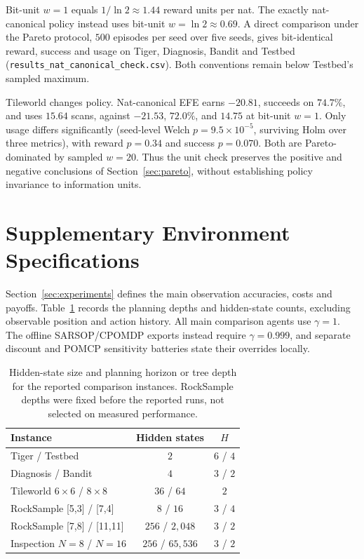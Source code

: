 Bit-unit $w=1$ equals $1/\ln2\approx1.44$ reward units per nat. The exactly nat-canonical policy instead uses bit-unit $w=\ln2\approx0.69$. A direct comparison under the Pareto protocol, $500$ episodes per seed over five seeds, gives bit-identical reward, success and usage on Tiger, Diagnosis, Bandit and Testbed (\texttt{results\_nat\_canonical\_check.csv}). Both conventions remain below Testbed's sampled maximum.

Tileworld changes policy. Nat-canonical EFE earns $-20.81$, succeeds on $74.7\%$, and uses $15.64$ scans, against $-21.53$, $72.0\%$, and $14.75$ at bit-unit $w=1$. Only usage differs significantly (seed-level Welch $p=9.5\times10^{-5}$, surviving Holm over three metrics), with reward $p=0.34$ and success $p=0.070$. Both are Pareto-dominated by sampled $w=20$. Thus the unit check preserves the positive and negative conclusions of Section~\ref{sec:pareto}, without establishing policy invariance to information units.

\FloatBarrier

\section{Supplementary Environment Specifications}
\label{app:envs}

Section~\ref{sec:experiments} defines the main observation accuracies, costs and payoffs. Table~\ref{tab:environment_depths} records the planning depths and hidden-state counts, excluding observable position and action history. All main comparison agents use $\gamma=1$. The offline SARSOP/CPOMDP exports instead require $\gamma=0.999$, and separate discount and POMCP sensitivity batteries state their overrides locally.

\begin{table}[htbp]
\centering
\caption{Hidden-state size and planning horizon or tree depth for the reported comparison instances. RockSample depths were fixed before the reported runs, not selected on measured performance.}
\label{tab:environment_depths}
\begin{tablebody}
\begin{tabular}{lcc}
\toprule
Instance & Hidden states & $H$ \\
\midrule
Tiger / Testbed & $2$ & $6$ / $4$ \\
Diagnosis / Bandit & $4$ & $3$ / $2$ \\
Tileworld $6\times6$ / $8\times8$ & $36$ / $64$ & $2$ \\
RockSample [5,3] / [7,4] & $8$ / $16$ & $3$ / $4$ \\
RockSample [7,8] / [11,11] & $256$ / $2{,}048$ & $3$ / $2$ \\
Inspection $N=8$ / $N=16$ & $256$ / $65{,}536$ & $3$ / $2$ \\
\bottomrule
\end{tabular}
\end{tablebody}
\end{table}


